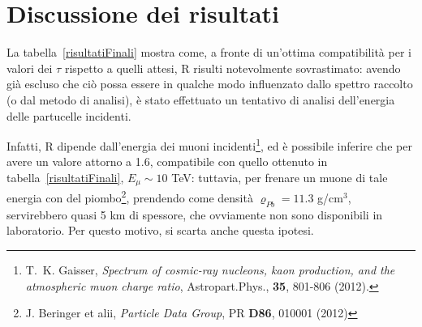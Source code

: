 \documentclass[10pt, oneside, a4paper]{article}   	%
\renewcommand{\rho}{\varrho}				%
\begin{document}
\section{Discussione dei risultati}

La tabella~\ref{risultatiFinali} mostra come, a fronte di un'ottima compatibilità per i valori dei $\tau$ rispetto a quelli attesi, R risulti notevolmente sovrastimato: avendo già escluso che ciò possa essere in qualche modo influenzato dallo spettro raccolto (o dal metodo di analisi), è stato effettuato un tentativo di analisi dell'energia delle partucelle incidenti.

Infatti, R dipende dall'energia dei muoni incidenti\footnote{T.~K. Gaisser, \emph{Spectrum of cosmic-ray nucleons, kaon production, and the atmospheric muon charge ratio}, Astropart.Phys., \textbf{35}, 801-806 (2012).}, ed è possibile inferire che per avere un valore attorno a 1.6, compatibile con quello ottenuto in tabella~\ref{risultatiFinali}, $E_{\mu} \sim 10$ TeV: tuttavia, per frenare un muone di tale energia con del piombo\footnote{J. Beringer et alii, \emph{Particle Data Group}, PR \textbf{D86}, 010001 (2012)}, prendendo come densità $ \rho_{Pb} = 11.3 $ g/cm$^3$, servirebbero quasi 5 km di spessore, che ovviamente non sono disponibili in laboratorio. Per questo motivo, si scarta anche questa ipotesi. %

\appendix


\end{document}
